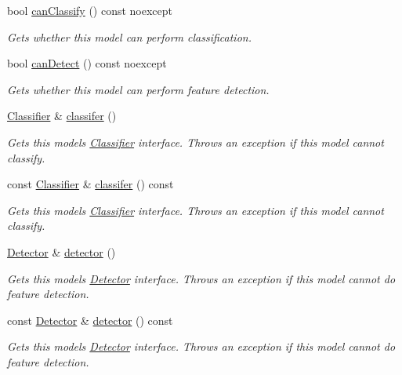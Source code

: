 \begin{DoxyCompactItemize}
bool \hyperlink{group___classification_module_ga27cea1c556b1303cd34db8df4f4a33da}{can\+Classify} () const noexcept
\begin{DoxyCompactList}\small\item\em Gets whether this model can perform classification. \end{DoxyCompactList}\item 
bool \hyperlink{group___classification_module_gaafe846e469639d35d62b4f68bc59d85c}{can\+Detect} () const noexcept
\begin{DoxyCompactList}\small\item\em Gets whether this model can perform feature detection. \end{DoxyCompactList}\item 
\hyperlink{classdg_1_1deepcore_1_1classification_1_1_classifier}{Classifier} \& \hyperlink{group___classification_module_gafe563e22d16379a9cd82e0a46d08e15a}{classifer} ()
\begin{DoxyCompactList}\small\item\em Gets this model\textquotesingle{}s \hyperlink{classdg_1_1deepcore_1_1classification_1_1_classifier}{Classifier} interface. Throws an exception if this model cannot classify. \end{DoxyCompactList}\item 
const \hyperlink{classdg_1_1deepcore_1_1classification_1_1_classifier}{Classifier} \& \hyperlink{group___classification_module_gad1c66c709abc2247957f20cb6b9f9fc6}{classifer} () const 
\begin{DoxyCompactList}\small\item\em Gets this model\textquotesingle{}s \hyperlink{classdg_1_1deepcore_1_1classification_1_1_classifier}{Classifier} interface. Throws an exception if this model cannot classify. \end{DoxyCompactList}\item 
\hyperlink{classdg_1_1deepcore_1_1classification_1_1_detector}{Detector} \& \hyperlink{group___classification_module_gadf0416476dc05f6e06f6c9f1f86b149d}{detector} ()
\begin{DoxyCompactList}\small\item\em Gets this model\textquotesingle{}s \hyperlink{classdg_1_1deepcore_1_1classification_1_1_detector}{Detector} interface. Throws an exception if this model cannot do feature detection. \end{DoxyCompactList}\item 
const \hyperlink{classdg_1_1deepcore_1_1classification_1_1_detector}{Detector} \& \hyperlink{group___classification_module_ga1758ede5c855a4a52556b9f97e1454a8}{detector} () const 
\begin{DoxyCompactList}\small\item\em Gets this model\textquotesingle{}s \hyperlink{classdg_1_1deepcore_1_1classification_1_1_detector}{Detector} interface. Throws an exception if this model cannot do feature detection. \end{DoxyCompactList}\end{DoxyCompactItemize}

